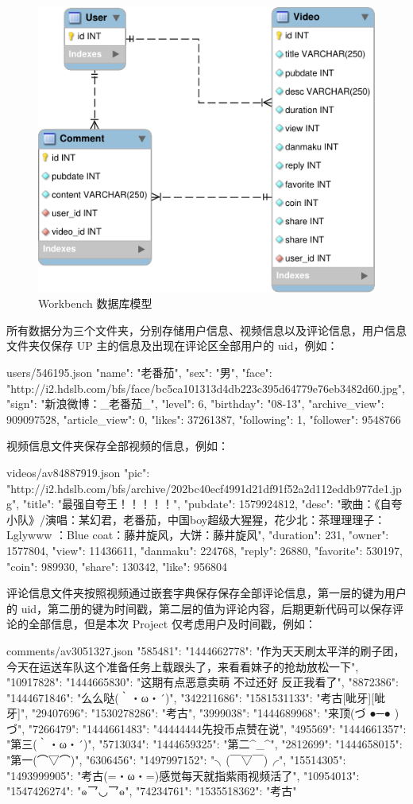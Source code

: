 \begin{figure}[H]
    \centering
    \includegraphics[width=.5\textwidth]{figures/1.pdf}
    \caption{Workbench 数据库模型}\label{F:workbench-model}
\end{figure}

所有数据分为三个文件夹，分别存储用户信息、视频信息以及评论信息，用户信息文件夹仅保存 UP 主的信息及出现在评论区全部用户的 uid，例如：
\begin{python}{users/546195.json}
{"name": "老番茄", "sex": "男", "face": "http://i2.hdslb.com/bfs/face/bc5ca101313d4db223c395d64779e76eb3482d60.jpg", "sign": "新浪微博：_老番茄_", "level": 6, "birthday": "08-13", "archive_view": 909097528, "article_view": 0, "likes": 37261387, "following": 1, "follower": 9548766}
\end{python}
视频信息文件夹保存全部视频的信息，例如：
\begin{python}{videos/av84887919.json}
{"pic": "http://i2.hdslb.com/bfs/archive/202bc40ecf4991d21df91f52a2d112eddb977de1.jpg", "title": "最强自夸王！！！！！", "pubdate": 1579924812, "desc": "歌曲：《自夸小队》/演唱：某幻君，老番茄，中国boy超级大猩猩，花少北\nHOOK：茶理理理子：Lglywww ：Blue coat：藤井旋风，大饼：藤井旋风", "duration": 231, "owner": 1577804, "view": 11436611, "danmaku": 224768, "reply": 26880, "favorite": 530197, "coin": 989930, "share": 130342, "like": 956804}
\end{python}
评论信息文件夹按照视频通过嵌套字典保存保存全部评论信息，第一层的键为用户的 uid，第二册的键为时间戳，第二层的值为评论内容，后期更新代码可以保存评论的全部信息，但是本次 Project 仅考虑用户及时间戳，例如：
\begin{python}{comments/av3051327.json}
{"585481": {"1444662778": "作为天天刷太平洋的刷子团，今天在运送车队这个准备任务上载跟头了，来看看妹子的抢劫放松一下"}, "10917828": {"1444665830": "这期有点恶意卖萌    不过还好  反正我看了"}, "8872386": {"1444671846": "么么哒(｀・ω・´)"}, "342211686": {"1581531133": "考古[呲牙][呲牙]"}, "29407696": {"1530278286": "考古"}, "3999038": {"1444689968": "来顶(づ ●─● )づ"}, "7266479": {"1444661483": "44444444先投币点赞在说"}, "495569": {"1444661357": "第三(｀・ω・´)"}, "5713034": {"1444659325": "第二^_^"}, "2812699": {"1444658015": "第一(⌒▽⌒)"}, "6306456": {"1497997152": "╮(￣▽￣)╭"}, "15514305": {"1493999905": "考古(=・ω・=)感觉每天就指紫雨视频活了"}, "10954013": {"1547426274": "๑乛◡乛๑"}, "74234761": {"1535518362": "考古"}}
\end{python}

